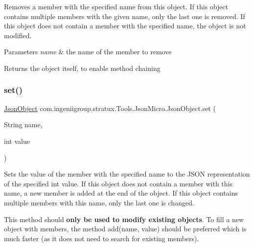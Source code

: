 Removes a member with the specified name from this object. If this object contains multiple members with the given name, only the last one is removed. If this object does not contain a member with the specified name, the object is not modified.


\begin{DoxyParams}{Parameters}
{\em name} & the name of the member to remove \\
\hline
\end{DoxyParams}
\begin{DoxyReturn}{Returns}
the object itself, to enable method chaining 
\end{DoxyReturn}
\mbox{\label{classcom_1_1ingeniigroup_1_1stratux_1_1_tools_1_1_json_micro_1_1_json_object_a9143359b231f436b063663338a6066c0}} 
\subsubsection{\texorpdfstring{set()}{set()}\hspace{0.1cm}{\footnotesize\ttfamily [1/7]}}
{\footnotesize\ttfamily \hyperlink{classcom_1_1ingeniigroup_1_1stratux_1_1_tools_1_1_json_micro_1_1_json_object}{Json\+Object} com.\+ingeniigroup.\+stratux.\+Tools.\+Json\+Micro.\+Json\+Object.\+set (\begin{DoxyParamCaption}\item[{String}]{name,  }\item[{int}]{value }\end{DoxyParamCaption})}

Sets the value of the member with the specified name to the J\+S\+ON representation of the specified {\ttfamily int} value. If this object does not contain a member with this name, a new member is added at the end of the object. If this object contains multiple members with this name, only the last one is changed. 

This method should {\bfseries only be used to modify existing objects}. To fill a new object with members, the method {\ttfamily add(name, value)} should be preferred which is much faster (as it does not need to search for existing members). 


